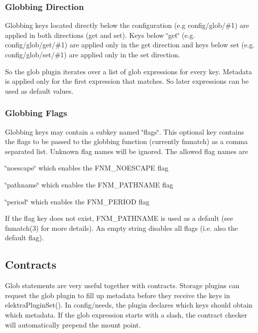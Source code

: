 \subsubsection*{Globbing Direction}

Globbing keys located directly below the configuration (e.\+g {\ttfamily config/glob/\#1}) are applied in both directions (get and set). Keys below \char`\"{}get\char`\"{} (e.\+g. {\ttfamily config/glob/get/\#1}) are applied only in the get direction and keys below set (e.\+g. {\ttfamily config/glob/set/\#1}) are applied only in the set direction.

So the glob plugin iterates over a list of glob expressions for every key. Metadata is applied only for the first expression that matches. So later expressions can be used as default values.

\subsubsection*{Globbing Flags}

Globbing keys may contain a subkey named \char`\"{}flags\char`\"{}. This optional key contains the flags to be passed to the globbing function (currently fnmatch) as a comma separated list. Unknown flag names will be ignored. The allowed flag names are


\begin{DoxyItemize}
\item \char`\"{}noescape\char`\"{} which enables the F\+N\+M\+\_\+\+N\+O\+E\+S\+C\+A\+PE flag
\item \char`\"{}pathname\char`\"{} which enables the F\+N\+M\+\_\+\+P\+A\+T\+H\+N\+A\+ME flag
\item \char`\"{}period\char`\"{} which enables the F\+N\+M\+\_\+\+P\+E\+R\+I\+OD flag
\end{DoxyItemize}

If the flag key does not exist, F\+N\+M\+\_\+\+P\+A\+T\+H\+N\+A\+ME is used as a default (see fnmatch(3) for more details). An empty string disables all flags (i.\+e. also the default flag).

\subsection*{Contracts}

Glob statements are very useful together with contracts. Storage plugins can request the glob plugin to fill up metadata before they receive the keys in {\ttfamily elektra\+Plugin\+Set()}. In {\ttfamily config/needs}, the plugin declares which keys should obtain which metadata. If the glob expression starts with a slash, the contract checker will automatically prepend the mount point.

